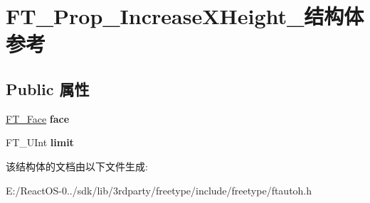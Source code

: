 \hypertarget{struct_f_t___prop___increase_x_height__}{}\section{F\+T\+\_\+\+Prop\+\_\+\+Increase\+X\+Height\+\_\+结构体 参考}
\label{struct_f_t___prop___increase_x_height__}
\subsection*{Public 属性}
\begin{DoxyCompactItemize}
\item 
\mbox{\label{struct_f_t___prop___increase_x_height___ae761b2b7e3e086b3d672f16f5cc48643}} 
\hyperlink{struct_f_t___face_rec__}{F\+T\+\_\+\+Face} {\bfseries face}
\item 
\mbox{\label{struct_f_t___prop___increase_x_height___ae276b4241881f9e8ea57fd3a9e9c0d8a}} 
F\+T\+\_\+\+U\+Int {\bfseries limit}
\end{DoxyCompactItemize}


该结构体的文档由以下文件生成\+:\begin{DoxyCompactItemize}
\item 
E\+:/\+React\+O\+S-\/0../sdk/lib/3rdparty/freetype/include/freetype/ftautoh.\+h\end{DoxyCompactItemize}
